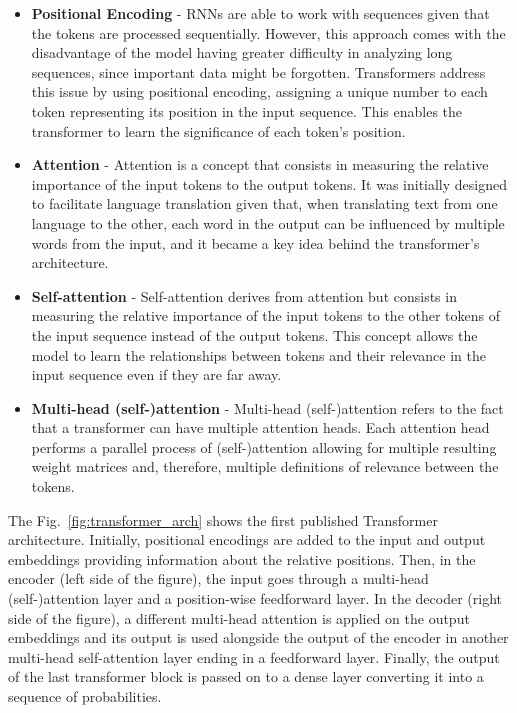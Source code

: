 \begin{itemize}
    \item \textbf{Positional Encoding} - RNNs are able to work with sequences given that the tokens are processed sequentially. However, this approach comes with the disadvantage of the model having greater difficulty in analyzing long sequences, since important data might be forgotten. Transformers address this issue by using positional encoding, assigning a unique number to each token representing its position in the input sequence. This enables the transformer to learn the significance of each token's position.
    
    \item \textbf{Attention} - Attention is a concept that consists in measuring the relative importance of the input tokens to the output tokens. It was initially designed to facilitate language translation given that, when translating text from one language to the other, each word in the output can be influenced by multiple words from the input, and it became a key idea behind the transformer's architecture.

    \item \textbf{Self-attention} - Self-attention derives from attention but consists in measuring the relative importance of the input tokens to the other tokens of the input sequence instead of the output tokens. This concept allows the model to learn the relationships between tokens and their relevance in the input sequence even if they are far away.

    \item \textbf{Multi-head (self-)attention} - Multi-head (self-)attention refers to the fact that a transformer can have multiple attention heads. Each attention head performs a parallel process of (self-)attention allowing for multiple resulting weight matrices and, therefore, multiple definitions of relevance between the tokens.
\end{itemize}

The Fig.~\ref{fig:transformer_arch} shows the first published Transformer architecture. Initially, positional encodings are added to the input and output embeddings providing information about the relative positions. Then, in the encoder (left side of the figure), the input goes through a multi-head (self-)attention layer and a position-wise feedforward layer. In the decoder (right side of the figure), a different multi-head attention is applied on the output embeddings and its output is used alongside the output of the encoder in another multi-head self-attention layer ending in a feedforward layer. Finally, the output of the last transformer block is passed on to a dense layer converting it into a sequence of probabilities.

